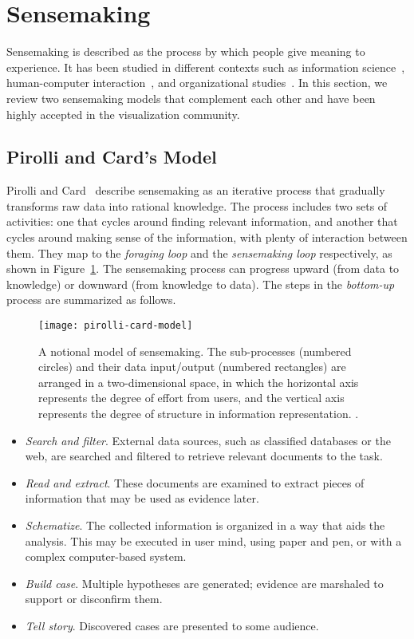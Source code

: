 \section{Sensemaking}
Sensemaking is described as the process by which people give meaning to experience. It has been studied in different contexts such as information science~\cite{Dervin1983}, human-computer interaction~\cite{Russell1993}, and organizational studies~\cite{Weick1995}. In this section, we review two sensemaking models that complement each other and have been highly accepted in the visualization community.

\subsection{Pirolli and Card's Model}
\label{sub:rv-pcm}
Pirolli and Card~\cite{Pirolli2005} describe sensemaking as an iterative process that gradually transforms raw data into rational knowledge. The process includes two sets of activities: one that cycles around finding relevant information, and another that cycles around making sense of the information, with plenty of interaction between them. They map to the \emph{foraging loop} and the \emph{sensemaking loop} respectively, as shown in Figure~\ref{fig:pirolli-card-model}. The sensemaking process can progress upward (from data to knowledge) or downward (from knowledge to data). The steps in the \emph{bottom-up} process are summarized as follows.

\begin{figure}[!htb]
	\centering
	\texttt{[image: pirolli-card-model]}
	\caption{A notional model of sensemaking. The sub-processes (numbered circles) and their data input/output (numbered rectangles) are arranged in a two-dimensional space, in which the horizontal axis represents the degree of effort from users, and the vertical axis represents the degree of structure in information representation. .}
	\label{fig:pirolli-card-model}
\end{figure}

\begin{itemize}
	\item \emph{Search and filter}. External data sources, such as classified databases or the web, are searched and filtered to retrieve relevant documents to the task.
	\item \emph{Read and extract}. These documents are examined to extract pieces of information that may be used as evidence later.
	\item \emph{Schematize}.  The collected information is organized in a way that aids the analysis. This may be executed in user mind, using paper and pen, or with a complex computer-based system.
	\item \emph{Build case}. Multiple hypotheses are generated; evidence are marshaled to support or disconfirm them.
	\item \emph{Tell story}. Discovered cases are presented to some audience.
\end{itemize}

